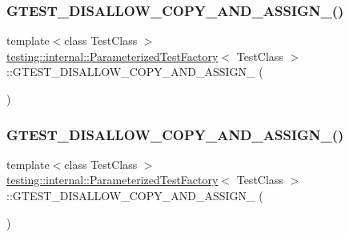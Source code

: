 \subsubsection{\texorpdfstring{GTEST\_DISALLOW\_COPY\_AND\_ASSIGN\_()}{GTEST\_DISALLOW\_COPY\_AND\_ASSIGN\_()}\hspace{0.1cm}{\footnotesize\ttfamily [1/3]}}
{\footnotesize\ttfamily template$<$class Test\+Class $>$ \\
\mbox{\hyperlink{classtesting_1_1internal_1_1_parameterized_test_factory}{testing\+::internal\+::\+Parameterized\+Test\+Factory}}$<$ Test\+Class $>$\+::G\+T\+E\+S\+T\+\_\+\+D\+I\+S\+A\+L\+L\+O\+W\+\_\+\+C\+O\+P\+Y\+\_\+\+A\+N\+D\+\_\+\+A\+S\+S\+I\+G\+N\+\_\+ (\begin{DoxyParamCaption}\item[{\mbox{\hyperlink{classtesting_1_1internal_1_1_parameterized_test_factory}{Parameterized\+Test\+Factory}}$<$ Test\+Class $>$}]{ }\end{DoxyParamCaption})\hspace{0.3cm}{\ttfamily [private]}}

\mbox{\label{classtesting_1_1internal_1_1_parameterized_test_factory_ac70e70bd61d0f66bbc68ed2587c42d92}} 
\subsubsection{\texorpdfstring{GTEST\_DISALLOW\_COPY\_AND\_ASSIGN\_()}{GTEST\_DISALLOW\_COPY\_AND\_ASSIGN\_()}\hspace{0.1cm}{\footnotesize\ttfamily [2/3]}}
{\footnotesize\ttfamily template$<$class Test\+Class $>$ \\
\mbox{\hyperlink{classtesting_1_1internal_1_1_parameterized_test_factory}{testing\+::internal\+::\+Parameterized\+Test\+Factory}}$<$ Test\+Class $>$\+::G\+T\+E\+S\+T\+\_\+\+D\+I\+S\+A\+L\+L\+O\+W\+\_\+\+C\+O\+P\+Y\+\_\+\+A\+N\+D\+\_\+\+A\+S\+S\+I\+G\+N\+\_\+ (\begin{DoxyParamCaption}\item[{\mbox{\hyperlink{classtesting_1_1internal_1_1_parameterized_test_factory}{Parameterized\+Test\+Factory}}$<$ Test\+Class $>$}]{ }\end{DoxyParamCaption})\hspace{0.3cm}{\ttfamily [private]}}

